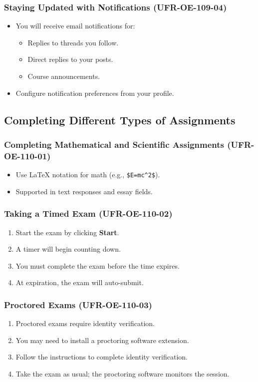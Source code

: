\subsubsection{Staying Updated with Notifications (UFR-OE-109-04)}
\begin{itemize}
    \item You will receive email notifications for:
    \begin{itemize}
        \item Replies to threads you follow.
        \item Direct replies to your posts.
        \item Course announcements.
    \end{itemize}
    \item Configure notification preferences from your profile.
\end{itemize}

\subsection{Completing Different Types of Assignments}

\subsubsection{Completing Mathematical and Scientific Assignments (UFR-OE-110-01)}
\begin{itemize}
    \item Use LaTeX notation for math (e.g., \texttt{\$E=mc\textasciicircum 2\$}).
    \item Supported in text responses and essay fields.
\end{itemize}

\subsubsection{Taking a Timed Exam (UFR-OE-110-02)}
\begin{enumerate}
    \item Start the exam by clicking \textbf{Start}.
    \item A timer will begin counting down.
    \item You must complete the exam before the time expires.
    \item At expiration, the exam will auto-submit.
\end{enumerate}

\subsubsection{Proctored Exams (UFR-OE-110-03)}
\begin{enumerate}
    \item Proctored exams require identity verification.
    \item You may need to install a proctoring software extension.
    \item Follow the instructions to complete identity verification.
    \item Take the exam as usual; the proctoring software monitors the session.
\end{enumerate}

